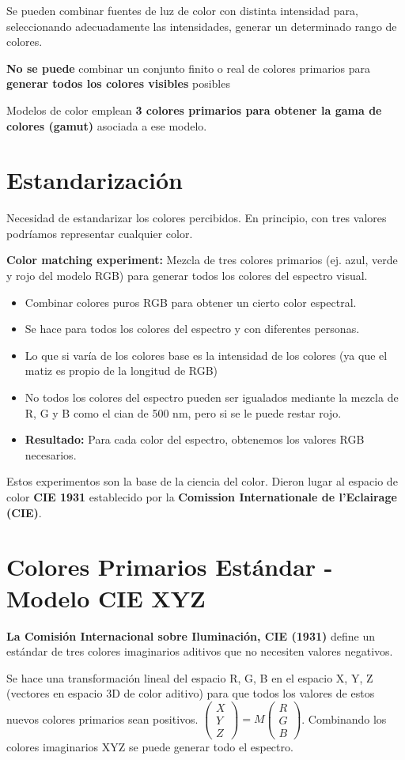Se pueden combinar fuentes de luz de color con distinta intensidad para, seleccionando adecuadamente las intensidades, generar un determinado rango de colores.

\textbf{No se puede} combinar un conjunto finito o real de colores primarios para \textbf{generar todos los colores visibles} posibles

Modelos de color emplean \textbf{3 colores primarios para obtener la gama de colores (gamut)} asociada a ese modelo.

\section{Estandarización}
Necesidad de estandarizar los colores percibidos. En principio, con tres valores podríamos representar cualquier color.

\textbf{Color matching experiment:} Mezcla de tres colores primarios (ej. azul, verde y rojo del modelo RGB) para generar todos los colores del espectro visual.
\begin{itemize}
	\item Combinar colores puros RGB para obtener un cierto color espectral.
	\item Se hace para todos los colores del espectro y con diferentes personas.
	\item Lo que si varía de los colores base es la intensidad de los colores (ya que el matiz es propio de la longitud de RGB)
	\item No todos los colores del espectro pueden ser igualados mediante la mezcla de R, G y B como el cian de 500 nm, pero si se le puede restar rojo.
	\item \textbf{Resultado:} Para cada color del espectro, obtenemos los valores RGB necesarios.
\end{itemize}

Estos experimentos son la base de la ciencia del color. Dieron lugar al espacio de color \textbf{CIE 1931} establecido por la \textbf{Comission Internationale de l'Eclairage (CIE)}.

\section{Colores Primarios Estándar - Modelo CIE XYZ}
\textbf{La Comisión Internacional sobre Iluminación, CIE (1931)} define un estándar de tres colores imaginarios aditivos que no necesiten valores negativos.

Se hace una transformación lineal del espacio R, G, B en el espacio X, Y, Z (vectores en espacio 3D de color aditivo) para que todos los valores de estos nuevos colores primarios sean positivos. $\left(\begin{matrix} X \\ Y \\ Z \end{matrix}\right)=M\left(\begin{matrix} R \\ G \\ B \end{matrix}\right)$. Combinando los colores imaginarios XYZ se puede generar todo el espectro.

